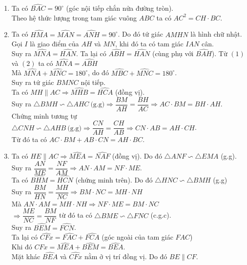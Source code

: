 \begin{ex}
{\begin{center}
\begin{tikzpicture}
			\end{tikzpicture}
	 	\end{center}  
	 	\begin{enumerate}
	 		\item Ta có $\widehat{BAC}=90^\circ$ (góc nội tiếp chắn nửa đường tròn).\\
	 		Theo hệ thức lượng trong tam giác vuông $ABC$ ta có $AC^2=CH\cdot BC$.
	 		\item Ta có $\widehat{HMA}=\widehat{MAN}=\widehat{ANH}=90^\circ$. Do đó tứ giác $AMHN$ là hình chữ nhật.\\
	 		Gọi $I$ là giao điểm của $AH$ và $MN$, khi đó ta có tam giác $IAN$ cân.\\
	 		Suy ra $\widehat{MNA}=\widehat{HAN}$.  
	 		Ta lại có $\widehat{ABH}=\widehat{HAN}$ (cùng phụ với $\widehat{BAH}$). 
	 		Từ $(1)$ và $(2)$ ta có $\widehat{MNA}=\widehat{ABH}$\\
	 		Mà $\widehat{MNA}+\widehat{MNC}=180^\circ$, do đó $\widehat{MBC}+\widehat{MNC}=180^\circ$.\\
	 		Suy ra tứ giác $BMNC$ nội tiếp.\\
	 		Ta có $ MH \parallel AC \Rightarrow \widehat{MHB}=\widehat{HCA}$ (đồng vị).\\
	 		Suy ra $\triangle BMH \backsim \triangle AHC\ \text{(g.g)} \Rightarrow \dfrac{BM}{AH}=\dfrac{BH}{AC} \Rightarrow AC\cdot BM = BH\cdot AH$.\\
	 		Chứng minh tương tự $\triangle CNH \backsim \triangle AHB\ \text{(g.g)} \Rightarrow \dfrac{CN}{AH}=\dfrac{CH}{AB}\Rightarrow CN\cdot AB = AH\cdot CH$.\\
	 		Từ đó ta có $AC\cdot BM +AB \cdot CN = AH\cdot BC$.
	 		\item  Ta có $HE \parallel AC \Rightarrow \widehat{MEA}=\widehat{NAF}$ (đồng vị). Do đó 
	 		$\triangle ANF \backsim \triangle EMA $ (g.g). \\
	 		Suy ra $\dfrac{AN}{ME}=\dfrac{NF}{AM}\Rightarrow AN\cdot AM = NF\cdot ME$.\\
	 		Ta có $\widehat{BHM}=\widehat{HCN}$ (chứng minh trên). Do đó $\triangle HNC \backsim \triangle BMH$ (g.g)\\
	 		Suy ra $\dfrac{BM}{HN}=\dfrac{MH}{NC}\Rightarrow BM\cdot NC = MH\cdot NH$\\
	 		Mà $AN\cdot AM = MH\cdot NH \Rightarrow NF\cdot ME = BM\cdot NC $ \\ 
	 		$ \Rightarrow \dfrac{ME}{NC}=\dfrac{BM}{NF}$ từ đó ta có $\triangle BME \backsim \triangle FNC$ (c.g.c).\\
	 		Suy ra $\widehat{BEM}=\widehat{FCN}$. \\
	 		Ta lại có $\widehat{CFx}=\widehat{FAC}+\widehat{FCA}$ (góc ngoài của tam giác $FAC$)\\
	 		Khi đó $\widehat{CFx}=\widehat{MEA}+\widehat{BEM}=\widehat{BEA}$.\\
	 		Mặt khác $\widehat{BEA}$ và $\widehat{CFx}$ nằm ở vị trí đồng vị. Do đó $BE \parallel CF$.
	 	\end{enumerate}
	}
\end{ex}


